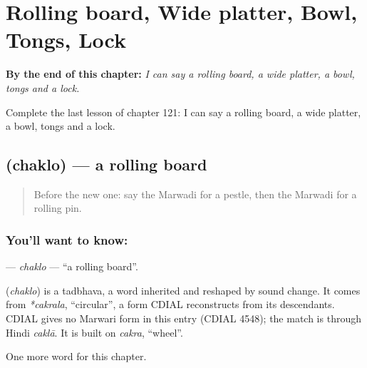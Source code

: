 
\chapter{Rolling board, Wide platter, Bowl, Tongs, Lock}
\label{ch:mw-rolling-board-wide-platter-bowl-tongs-lock}

\begin{chapteropening}
\textbf{By the end of this chapter:} \emph{I can say a rolling board, a wide platter, a bowl, tongs and a lock.}

Complete the last lesson of chapter 121: I can say a rolling board, a wide platter, a bowl, tongs and a lock.
\end{chapteropening}

\section[\texorpdfstring{\mw{चकलो} (chaklo)}{चकलो (chaklo)}]{ (chaklo) — a rolling board}

\label{lesson:MW-C121-chaklo}



\begin{quote}
Before the new one: say the Marwadi for a pestle, then the Marwadi for a rolling pin.
\end{quote}

\subsection*{You'll want to know: }
\textbf{} — \emph{chaklo} — \textquotedblleft{}a rolling board\textquotedblright{}.

\begin{cousinweb}
\textbf{} (\emph{chaklo}) is a tadbhava, a word inherited and reshaped by sound change. It comes from \emph{*cakrala}, \textquotedblleft{}circular\textquotedblright{}, a form CDIAL reconstructs from its descendants. CDIAL gives no Marwari form in this entry (CDIAL 4548); the match is through Hindi \emph{caklā}. It is built on \emph{cakra}, \textquotedblleft{}wheel\textquotedblright{}.
\end{cousinweb}

\begin{grammarlens}[title={What you've built}]
One more word for this chapter.
\end{grammarlens}

